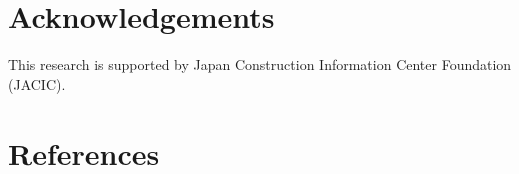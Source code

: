 \documentclass[review]{elsarticle}
\begin{document}
\section*{Acknowledgements}

This research is supported by Japan Construction Information Center Foundation (JACIC). 

\section*{References}


\end{document}

